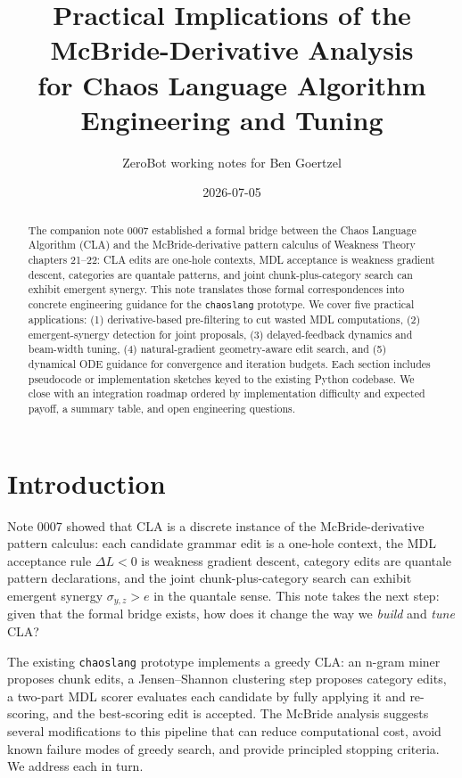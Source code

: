\documentclass[11pt]{article}
\title{Practical Implications of the McBride-Derivative Analysis\\
for Chaos Language Algorithm Engineering and Tuning}
\author{ZeroBot working notes for Ben Goertzel}
\date{2026-07-05}
\begin{document}
\maketitle

\begin{abstract}
The companion note 0007 established a formal bridge between the Chaos Language Algorithm (CLA) and the McBride-derivative pattern calculus of Weakness Theory chapters 21--22: CLA edits are one-hole contexts, MDL acceptance is weakness gradient descent, categories are quantale patterns, and joint chunk-plus-category search can exhibit emergent synergy.  This note translates those formal correspondences into concrete engineering guidance for the \texttt{chaoslang} prototype.  We cover five practical applications: (1) derivative-based pre-filtering to cut wasted MDL computations, (2) emergent-synergy detection for joint proposals, (3) delayed-feedback dynamics and beam-width tuning, (4) natural-gradient geometry-aware edit search, and (5) dynamical ODE guidance for convergence and iteration budgets.  Each section includes pseudocode or implementation sketches keyed to the existing Python codebase.  We close with an integration roadmap ordered by implementation difficulty and expected payoff, a summary table, and open engineering questions.
\end{abstract}

\tableofcontents

\section{Introduction}

Note 0007 \cite{cla_mcbride_bridge} showed that CLA is a discrete instance of the McBride-derivative pattern calculus: each candidate grammar edit is a one-hole context, the MDL acceptance rule $\Delta L < 0$ is weakness gradient descent, category edits are quantale pattern declarations, and the joint chunk-plus-category search can exhibit emergent synergy $\sigma_{y,z} > e$ in the quantale sense.  This note takes the next step: given that the formal bridge exists, how does it change the way we \emph{build} and \emph{tune} CLA?

The existing \texttt{chaoslang} prototype implements a greedy CLA: an n-gram miner proposes chunk edits, a Jensen--Shannon clustering step proposes category edits, a two-part MDL scorer evaluates each candidate by fully applying it and re-scoring, and the best-scoring edit is accepted.  The McBride analysis suggests several modifications to this pipeline that can reduce computational cost, avoid known failure modes of greedy search, and provide principled stopping criteria.  We address each in turn.
\end{document}
